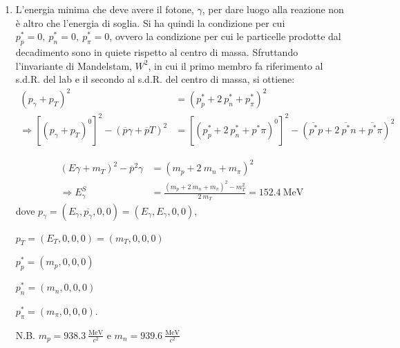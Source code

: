 \documentclass[12pt,twoside,a4]{article}
\begin{document}
 
\newpage
\begin{solution}
\begin{enumerate}[label=(\textit{\roman*})]
\vspace{-1cm}
\item L'energia minima che deve avere il fotone, $\gamma$, per dare luogo alla reazione non è altro che l'energia di soglia. Si ha quindi la condizione per cui $p^\ast_p = 0 , \ p^\ast_n = 0 , \ p^\ast_\pi = 0$, ovvero la condizione per cui le particelle prodotte dal decadimento sono in quiete rispetto al centro di massa.
Sfruttando l'invariante di Mandelstam, $W^2$, in cui il primo membro fa riferimento al s.d.R. del lab e il secondo al s.d.R. del centro di massa, si ottiene:
\begin{align*}
(p_\gamma + p_T)^2 &= (p^\ast_p + 2 \ p^\ast_n + p^\ast_\pi)^2 \\ \Rightarrow [(p_\gamma + p_T)^0]^2 - (\overline{p}\gamma + \overline{p}T)^2  &= [(p^\ast_p + 2 \ p^\ast_n + p^\ast\pi)^0]^2 - (\overline{p^\ast}p + 2 \ \overline{p^\ast}n + \overline{p^\ast}\pi)^2
\end{align*}

\begin{align*}
(E\gamma + m_T)^2 - \overline{p}^2\gamma &= (m_p + 2 \ m_n + m_\pi)^2 \\
\Rightarrow E^S_\gamma &= \frac{(m_p + 2 \ m_n + m_\pi)^2 - m^2_T}{2 \ m_T} = 152.4 \ \mathrm{MeV}
\end{align*}
dove $p_\gamma = (E_\gamma, \overline{p_\gamma},0,0) = (E_\gamma, E_\gamma, 0, 0)$, 

$p_T = (E_T, 0, 0, 0) = (m_T, 0 , 0 , 0)$

$p^\ast_p = (m_p, 0, 0, 0)$

$p^\ast_n = (m_n, 0, 0, 0)$

$p^\ast_\pi = (m_\pi, 0, 0, 0)$.


N.B. $m_p = 938.3 \ \frac{\mathrm{MeV}}{c^2}$ e $m_n = 939.6 \ \frac{\mathrm{MeV}}{c^2}$
\end{enumerate}
\end{solution}
\end{document}
